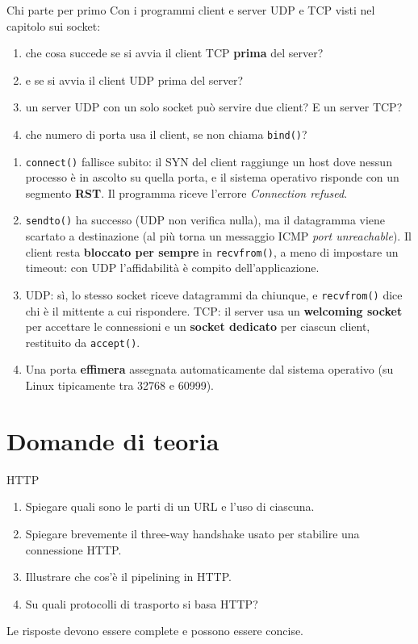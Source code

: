 \begin{esercizio}{Chi parte per primo}
Con i programmi client e server UDP e TCP visti nel capitolo sui socket:
\begin{enumerate}[label=(\alph*)]
    \item che cosa succede se si avvia il client TCP \textbf{prima} del server?
    \item e se si avvia il client UDP prima del server?
    \item un server UDP con un solo socket può servire due client? E un server TCP?
    \item che numero di porta usa il client, se non chiama \texttt{bind()}?
\end{enumerate}
\end{esercizio}

\svolgimento
\begin{enumerate}[label=(\alph*)]
    \item \texttt{connect()} fallisce subito: il SYN del client raggiunge un host dove nessun processo è in ascolto su quella
          porta, e il sistema operativo risponde con un segmento \textbf{RST}. Il programma riceve l'errore
          \emph{Connection refused}.
    \item \texttt{sendto()} ha successo (UDP non verifica nulla), ma il datagramma viene scartato a destinazione (al più torna
          un messaggio ICMP \emph{port unreachable}). Il client resta \textbf{bloccato per sempre} in \texttt{recvfrom()}, a
          meno di impostare un timeout: con UDP l'affidabilità è compito dell'applicazione.
    \item UDP: sì, lo stesso socket riceve datagrammi da chiunque, e \texttt{recvfrom()} dice chi è il mittente a cui rispondere.
          TCP: il server usa un \textbf{welcoming socket} per accettare le connessioni e un \textbf{socket dedicato} per ciascun
          client, restituito da \texttt{accept()}.
    \item Una porta \textbf{effimera} assegnata automaticamente dal sistema operativo (su Linux tipicamente tra 32768 e 60999).
\end{enumerate}

\section{Domande di teoria}

\begin{esercizio}{HTTP}
\begin{enumerate}[label=(\alph*)]
    \item Spiegare quali sono le parti di un URL e l'uso di ciascuna.
    \item Spiegare brevemente il three-way handshake usato per stabilire una connessione HTTP.
    \item Illustrare che cos'è il pipelining in HTTP.
    \item Su quali protocolli di trasporto si basa HTTP?
\end{enumerate}
Le risposte devono essere complete e possono essere concise.
\end{esercizio}

